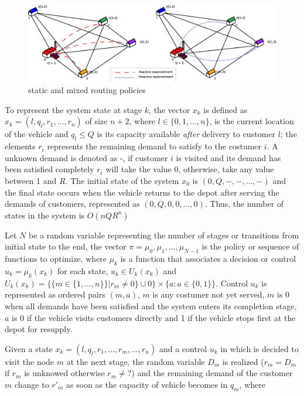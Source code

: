 \begin{figure}[!htbp]
  \begin{center}
   \includegraphics[width=1\textwidth]{Images/Chapter2/exIns4a.eps}
  \end{center}
    \caption{static and mixed routing policies}\label{fig:routing_policies}
\end{figure}

To represent the system state at stage $k$, the vector $x_k$ is defined as $x_k=(l,q_l, r_1,\ldots,r_n)$ of size $n+2$, where $l \in \{0,1,\ldots,n\}$, is the current location of the vehicle and $q_l \leq Q$ is its capacity available \textit{after} delivery to customer $l$; the elements $r_i$ represents the remaining demand to satisfy to the costumer $i$. A unknown demand is denoted as -, if customer $i$ is visited and its demand has been satisfied completely $r_i$ will take the value 0, otherwise, take any value between 1 and $R$. The initial state of the system $x_0$ is $(0,Q,-,-,\ldots,-)$ and the final state occurs when the vehicle returns to the depot after serving the demands of customers, represented as $(0,Q,0,0,\ldots,0)$. Thus, the number of states in the system is $O(nQR^n)$

Let $N$ be a random variable representing the number of stages or transitions from initial state to the end, the vector $\pi = {\mu_0, \mu_1,\ldots, \mu_{N-1}}$ is the policy or sequence of functions to optimize, where $\mu_k$ is a function that associates a decision or control $u_k=\mu_k(x_k)$ for each state, $u_k \in U_k(x_k)$ and $U_k(x_k) = \{\{m \in \{1,\ldots,n\}\}|r_m\neq0\}\cup 0\} \times \{a:a \in \{0,1\}\}$. Control $u_k$ is represented as ordered pairs $(m,a)$, $m$ is any costumer not yet served, $m$ is 0 when all demands have been satisfied and the system enters its completion stage, $a$ is 0 if the vehicle visits customers directly and 1 if the vehicle stops first at the depot for resupply.

Given a state $x_k=(l,q_l,r_1,\ldots,r_m,\ldots,r_n)$ and a control $u_k$ in which is decided to visit the node $m$ at the next stage, the random variable $D_m$ is realized ($r_m = D_m$ if $r_m$ is unknowed otherwise $r_m \neq ?$) and the remaining demand of the customer $m$ change to $r'_m$ as soon as the capacity of vehicle becomes in $q_m$, where

